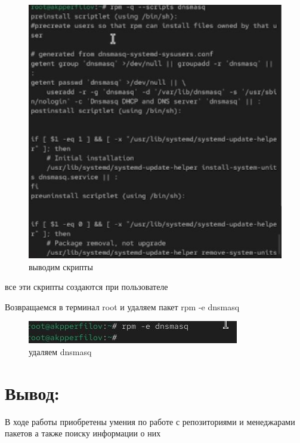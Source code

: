 \documentclass[
  english,
  russian,
  12pt,
  a4paper,
  DIV=11,
  numbers=noendperiod]{scrreprt}
\begin{document}
\begin{figure}

{\centering \includegraphics[width=0.71\linewidth,height=\textheight,keepaspectratio]{image/41.jpg}

}

\caption{выводим скрипты}

\end{figure}%

все эти скрипты создаются при пользователе

Возвращаемся в терминал root и удаляем пакет rpm -e dnsmasq

\begin{figure}

{\centering \includegraphics[width=0.71\linewidth,height=\textheight,keepaspectratio]{image/последний.jpg}

}

\caption{удаляем dnsmasq}

\end{figure}%

\chapter{Вывод:}\label{ux432ux44bux432ux43eux434}

В ходе работы приобретены умения по работе с репозиториями и менеджарами
пакетов а также поиску информации о них


\printbibliography
\end{document}
